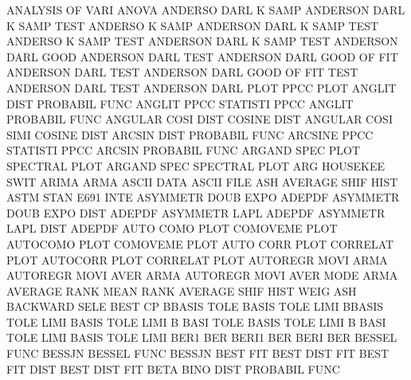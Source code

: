 ANALYSIS OF   VARI                      ANOVA
ANDERSO  DARL K    SAMP                 ANDERSON DARL K    SAMP TEST
ANDERSO  K    SAMP                      ANDERSON DARL K    SAMP TEST
ANDERSO  K    SAMP TEST                 ANDERSON DARL K    SAMP TEST
ANDERSON DARL GOOD                      ANDERSON DARL TEST
ANDERSON DARL GOOD OF   FIT             ANDERSON DARL TEST
ANDERSON DARL GOOD OF   FIT  TEST       ANDERSON DARL TEST
ANDERSON DARL PLOT                      PPCC     PLOT
ANGLIT   DIST                           PROBABIL FUNC
ANGLIT   PPCC                           STATISTI PPCC
ANGLIT                                  PROBABIL FUNC
ANGULAR  COSI DIST                      COSINE   DIST
ANGULAR  COSI SIMI                      COSINE   DIST
ARCSIN   DIST                           PROBABIL FUNC
ARCSINE  PPCC                           STATISTI PPCC
ARCSIN                                  PROBABIL FUNC
ARGAND   SPEC PLOT                      SPECTRAL PLOT
ARGAND   SPEC                           SPECTRAL PLOT
ARG                                     HOUSEKEE SWIT
ARIMA                                   ARMA
ASCII    DATA                           ASCII    FILE
ASH                                     AVERAGE  SHIF HIST
ASTM     STAN                           E691     INTE
ASYMMETR DOUB EXPO                      ADEPDF
ASYMMETR DOUB EXPO DIST                 ADEPDF
ASYMMETR LAPL                           ADEPDF
ASYMMETR LAPL DIST                      ADEPDF
AUTO     COMO PLOT                      COMOVEME PLOT
AUTOCOMO PLOT                           COMOVEME PLOT
AUTO     CORR PLOT                      CORRELAT PLOT
AUTOCORR PLOT                           CORRELAT PLOT
AUTOREGR MOVI                           ARMA
AUTOREGR MOVI AVER                      ARMA
AUTOREGR MOVI AVER MODE                 ARMA
AVERAGE  RANK                           MEAN     RANK
AVERAGE  SHIF HIST WEIG                 ASH
BACKWARD SELE                           BEST     CP
BBASIS   TOLE                           BASIS    TOLE LIMI
BBASIS   TOLE LIMI                      BASIS    TOLE LIMI
B        BASI TOLE                      BASIS    TOLE LIMI
B        BASI TOLE LIMI                 BASIS    TOLE LIMI
BER1                                    BER
BERI1                                   BER
BERI                                    BER
BESSEL   FUNC                           BESSJN
BESSEL   FUNC                           BESSJN
BEST     FIT                            BEST     DIST FIT
BEST     FIT  DIST                      BEST     DIST FIT
BETA     BINO DIST                      PROBABIL FUNC
